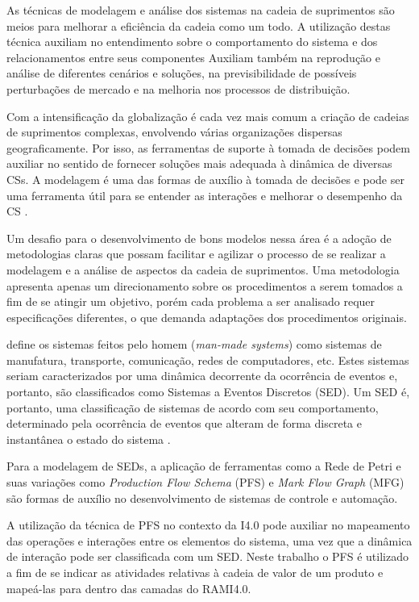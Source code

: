	As técnicas de modelagem e análise dos sistemas na cadeia de suprimentos são meios para melhorar a eficiência da cadeia como um todo. A utilização destas técnica auxiliam no entendimento sobre o comportamento do sistema e dos relacionamentos entre seus componentes Auxiliam também na reprodução e análise de diferentes cenários e soluções, na previsibilidade de possíveis perturbações de mercado e na melhoria nos processos de distribuição.
	
	Com a intensificação da globalização é cada vez mais comum a criação de cadeias de suprimentos complexas, envolvendo várias organizações dispersas geograficamente. Por isso, as ferramentas de suporte à tomada de decisões podem auxiliar no sentido de fornecer soluções mais adequada à dinâmica de diversas CSs. A modelagem é uma das formas de auxílio à tomada de decisões e pode ser uma ferramenta útil para se entender as interações e melhorar o desempenho da CS \cite{oliveira2016supplychain}.
	
	Um desafio para o desenvolvimento de bons modelos nessa área é a adoção de metodologias claras que possam facilitar e agilizar o processo de se realizar a modelagem e a análise de aspectos da cadeia de suprimentos. Uma metodologia apresenta apenas um direcionamento sobre os procedimentos a serem tomados a fim de se atingir um objetivo, porém cada problema a ser analisado requer especificações diferentes, o que demanda adaptações dos procedimentos originais.
	
	 define os sistemas feitos pelo homem (\textit{man-made systems}) como sistemas de manufatura, transporte, comunicação, redes de computadores, etc. Estes sistemas seriam caracterizados por uma dinâmica decorrente da ocorrência de eventos e, portanto, são classificados como Sistemas a Eventos Discretos (SED). Um SED é, portanto, uma classificação de sistemas de acordo com seu comportamento, determinado pela ocorrência de eventos que alteram de forma discreta e instantânea o estado do sistema \cite{miyagi1996controle}.
	
	Para a modelagem de SEDs, a aplicação de ferramentas como a Rede de Petri e suas variações como \textit{Production Flow Schema} (PFS) e \textit{Mark Flow Graph} (MFG) são formas de auxílio no desenvolvimento de sistemas de controle e automação.
	
	A utilização da técnica de PFS no contexto da I4.0 pode auxiliar no mapeamento das operações e interações entre os elementos do sistema, uma vez que a dinâmica de interação pode ser classificada com um SED. Neste trabalho o PFS é utilizado a fim de se indicar as atividades relativas à cadeia de valor de um produto e mapeá-las para dentro das camadas do RAMI4.0.
	
